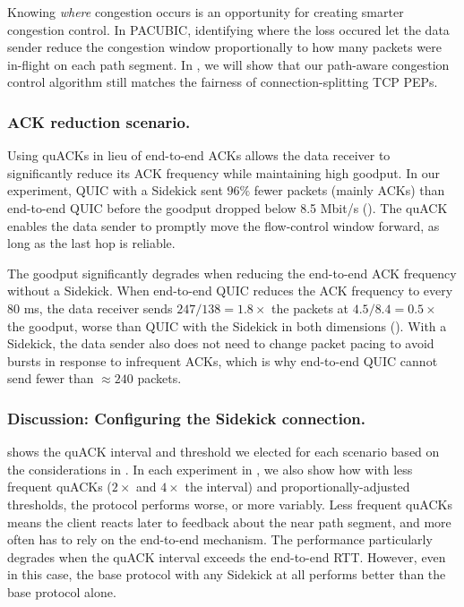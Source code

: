 Knowing \emph{where} congestion occurs is an opportunity for creating smarter
congestion control. In PACUBIC, identifying where the loss occured let the data
sender reduce the congestion window proportionally to how many packets were
in-flight on each path segment. In , we
will show that our path-aware congestion control algorithm still matches the
fairness of connection-splitting TCP PEPs.

\subsubsection{ACK reduction scenario.}

Using quACKs in lieu of end-to-end ACKs allows the data receiver to
significantly reduce its ACK frequency while maintaining high goodput.
In our experiment, QUIC with a Sidekick sent $96\%$ fewer packets (mainly ACKs)
than end-to-end QUIC before the goodput dropped below 8.5 Mbit/s
().
The quACK enables the data sender to promptly move the flow-control window forward,
as long as the last hop is reliable.

The goodput significantly degrades when reducing the end-to-end ACK frequency
without a Sidekick. When end-to-end QUIC reduces the ACK frequency to every
80 ms, the data receiver sends $247 / 138 = 1.8\times$ the packets at
$4.5 / 8.4 = 0.5\times$ the goodput, worse than QUIC with the Sidekick
in both dimensions (). With a Sidekick,
the data sender also does not need to change packet pacing to avoid bursts in
response to infrequent ACKs, which is why end-to-end QUIC cannot send fewer
than $\approx 240$ packets.

\subsubsection{Discussion: Configuring the Sidekick connection.}
 shows the quACK interval and threshold we
elected for each scenario based on the considerations in
. In each experiment in ,
we also show how with less frequent quACKs ($2\times$ and $4\times$ the
interval) and proportionally-adjusted thresholds, the protocol performs worse,
or more variably. Less frequent quACKs means the client reacts later to
feedback about the near path segment, and more often has to rely on the
end-to-end mechanism. The performance particularly degrades when the quACK
interval exceeds the end-to-end RTT. However, even in this case, the base
protocol with any Sidekick at all performs better than the base protocol alone\@.

